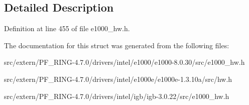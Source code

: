 \subsection{Detailed Description}


Definition at line 455 of file e1000\_\-hw.h.



The documentation for this struct was generated from the following files:\begin{DoxyCompactItemize}
\item 
src/extern/PF\_\-RING-\/4.7.0/drivers/intel/e1000/e1000-\/8.0.30/src/e1000\_\-hw.h\item 
src/extern/PF\_\-RING-\/4.7.0/drivers/intel/e1000e/e1000e-\/1.3.10a/src/hw.h\item 
src/extern/PF\_\-RING-\/4.7.0/drivers/intel/igb/igb-\/3.0.22/src/e1000\_\-hw.h\end{DoxyCompactItemize}
